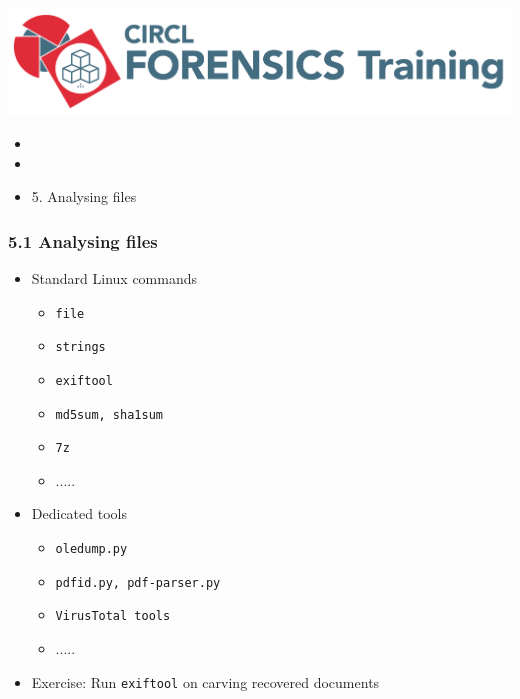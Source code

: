 %
%



\begin{frame}
    \includegraphics[scale=0.3]{images/logo-circl-Forensics.png}
    \begin{itemize}
        \item[]
        \item[]
        \item[] 5. Analysing files
    \end{itemize}
\end{frame}


\begin{frame}[fragile]
  \frametitle{5.1 Analysing files}
    \begin{itemize}
       \item Standard Linux commands
            \begin{itemize}
                \item[] \texttt{file}
                \item[] \texttt{strings}
                \item[] \texttt{exiftool}
                \item[] \texttt{md5sum, sha1sum}
                \item[] \texttt{7z}
                \item[] .....
            \end{itemize}
       \item Dedicated tools
            \begin{itemize}
                \item[] \texttt{oledump.py}
                \item[] \texttt{pdfid.py, pdf-parser.py}
                \item[] \texttt{VirusTotal tools}
                \item[] .....
            \end{itemize}
       \item Exercise: Run \texttt{exiftool} on carving recovered documents
    \end{itemize}
\end{frame}


